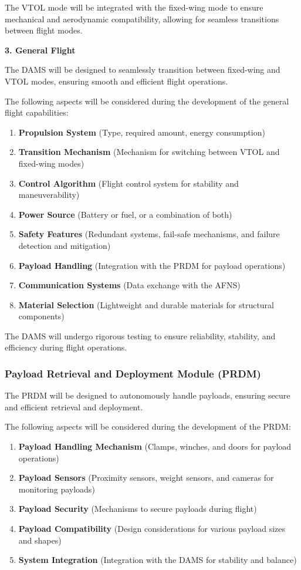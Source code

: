 \documentclass[12pt]{article}
\begin{document}
The VTOL mode will be integrated with the fixed-wing mode to ensure mechanical and aerodynamic compatibility, allowing for seamless transitions between flight modes.

\textbf{3. General Flight}

The DAMS will be designed to seamlessly transition between fixed-wing and VTOL modes, ensuring smooth and efficient flight operations.

The following aspects will be considered during the development of the general flight capabilities:
\begin{enumerate}
    \item \textbf{Propulsion System} (Type, required amount, energy consumption)
    \item \textbf{Transition Mechanism} (Mechanism for switching between VTOL and fixed-wing modes)
    \item \textbf{Control Algorithm} (Flight control system for stability and maneuverability)
    \item \textbf{Power Source} (Battery or fuel, or a combination of both)
    \item \textbf{Safety Features} (Redundant systems, fail-safe mechanisms, and failure detection and mitigation)
    \item \textbf{Payload Handling} (Integration with the PRDM for payload operations)
    \item \textbf{Communication Systems} (Data exchange with the AFNS)
    \item \textbf{Material Selection} (Lightweight and durable materials for structural components)
\end{enumerate}

The DAMS will undergo rigorous testing to ensure reliability, stability, and efficiency during flight operations.

\subsubsection{Payload Retrieval and Deployment Module (PRDM)}
The PRDM will be designed to autonomously handle payloads, ensuring secure and efficient retrieval and deployment.

The following aspects will be considered during the development of the PRDM:
\begin{enumerate}
    \item \textbf{Payload Handling Mechanism} (Clamps, winches, and doors for payload operations)
    \item \textbf{Payload Sensors} (Proximity sensors, weight sensors, and cameras for monitoring payloads)
    \item \textbf{Payload Security} (Mechanisms to secure payloads during flight)
    \item \textbf{Payload Compatibility} (Design considerations for various payload sizes and shapes)
    \item \textbf{System Integration} (Integration with the DAMS for stability and balance)
\end{enumerate}
\end{document}
